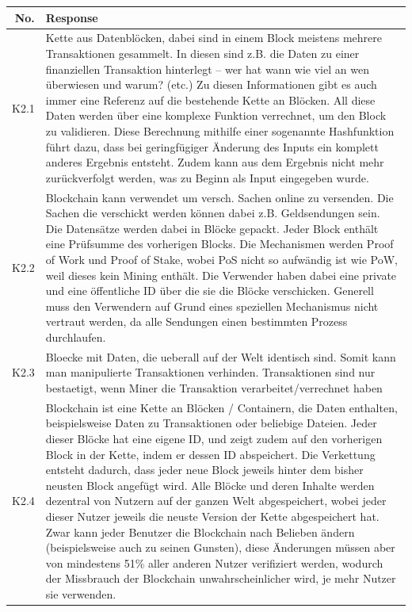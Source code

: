 \begin{table}[H]
    \centering
    \begin{tabularx}{\textwidth}{r|X}
        No. & Response \\ \hline
         K2.1 & Kette aus Datenblöcken, dabei sind in einem Block meistens mehrere Transaktionen gesammelt. In diesen sind z.B. die Daten zu einer finanziellen Transaktion hinterlegt – wer hat wann wie viel an wen überwiesen und warum? (etc.) Zu diesen Informationen gibt es auch immer eine Referenz auf die bestehende Kette an Blöcken. All diese Daten werden über eine komplexe Funktion verrechnet, um den Block zu validieren. Diese Berechnung mithilfe einer sogenannte Hashfunktion führt dazu, dass bei geringfügiger Änderung des Inputs ein komplett anderes Ergebnis entsteht. Zudem kann aus dem Ergebnis nicht mehr zurückverfolgt werden, was zu Beginn als Input eingegeben wurde.\\
         K2.2 & Blockchain kann verwendet um versch. Sachen online zu versenden. Die Sachen die verschickt werden können dabei z.B. Geldsendungen sein. Die Datensätze werden dabei in Blöcke gepackt. Jeder Block enthält eine Prüfsumme des vorherigen Blocks. Die Mechanismen werden Proof of Work und Proof of Stake, wobei PoS nicht so aufwändig ist wie PoW, weil dieses kein Mining enthält. Die Verwender haben dabei eine private und eine öffentliche ID über die sie die Blöcke verschicken. Generell muss den Verwendern auf Grund eines speziellen Mechanismus nicht vertraut werden, da alle Sendungen einen bestimmten Prozess durchlaufen. \\
         K2.3 & Bloecke mit Daten, die ueberall auf der Welt identisch sind. Somit kann man manipulierte Transaktionen verhinden. Transaktionen sind nur bestaetigt, wenn Miner die Transaktion verarbeitet/verrechnet haben \\
         K2.4 & Blockchain ist eine Kette an Blöcken / Containern, die Daten enthalten, beispielsweise Daten zu Transaktionen oder beliebige Dateien. Jeder dieser Blöcke hat eine eigene ID, und zeigt zudem auf den vorherigen Block in der Kette, indem er dessen ID abspeichert. Die Verkettung entsteht dadurch, dass jeder neue Block jeweils hinter dem bisher neusten Block angefügt wird. Alle Blöcke und deren Inhalte werden dezentral von Nutzern auf der ganzen Welt abgespeichert, wobei jeder dieser Nutzer jeweils die neuste Version der Kette abgespeichert hat. Zwar kann jeder Benutzer die Blockchain nach Belieben ändern (beispielsweise auch zu seinen Gunsten), diese Änderungen müssen aber von mindestens 51\% aller anderen Nutzer verifiziert werden, wodurch der Missbrauch der Blockchain unwahrscheinlicher wird, je mehr Nutzer sie verwenden.\\

\end{tabularx}
\end{table}
